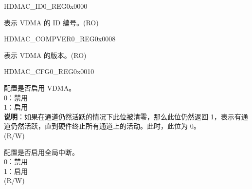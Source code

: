 \begin{register}{H}{DMAC\_ID0\_REG}{0x0000}\label{regdesc:DMACID0REG}
%
\regnewline%
\begin{regdesc}\begin{reglist}
\label{fielddesc:DMACDMACID}\item [DMAC\_DMAC\_ID] 表示 VDMA 的 ID 编号。(RO)
\end{reglist}\end{regdesc}
\end{register}


\begin{register}{H}{DMAC\_COMPVER0\_REG}{0x0008}\label{regdesc:DMACCOMPVER0REG}
%
\regnewline%
\begin{regdesc}\begin{reglist}
\label{fielddesc:DMACDMACCOMPVER}\item [DMAC\_DMAC\_COMPVER] 表示 VDMA 的版本。(RO)
\end{reglist}\end{regdesc}
\end{register}


\begin{register}{H}{DMAC\_CFG0\_REG}{0x0010}\label{regdesc:DMACCFG0REG}
%
%
%
\regnewline%
\begin{regdesc}\begin{reglist}
\label{fielddesc:DMACDMACEN}\item [DMAC\_DMAC\_EN] 配置是否启用 VDMA。\\
0：禁用\\
1：启用 \\
\textbf{说明}：如果在通道仍然活跃的情况下此位被清零，那么此位仍然返回 1，表示有通道仍然活跃，直到硬件终止所有通道上的活动。此时，此位为 0。\\ 
(R/W)
\label{fielddesc:DMACINTEN}\item [DMAC\_INT\_EN] 配置是否启用全局中断。 \\
0：禁用\\
1：启用 \\
(R/W)
\end{reglist}\end{regdesc}
\end{register}


